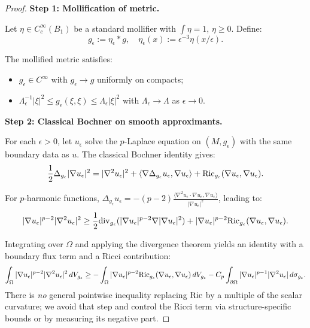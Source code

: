\begin{proof}
\textbf{Step 1: Mollification of metric.}

Let $\eta \in C^\infty_c(B_1)$ be a standard mollifier with $\int \eta = 1$, $\eta \ge 0$. Define:
\begin{equation}
    g_\epsilon := \eta_\epsilon * g, \quad \eta_\epsilon(x) := \epsilon^{-3} \eta(x/\epsilon).
\end{equation}

The mollified metric satisfies:
\begin{itemize}
    \item $g_\epsilon \in C^\infty$ with $g_\epsilon \to g$ uniformly on compacts;
    \item $\Lambda^{-1}_\epsilon |\xi|^2 \le g_\epsilon(\xi,\xi) \le \Lambda_\epsilon |\xi|^2$ with $\Lambda_\epsilon \to \Lambda$ as $\epsilon \to 0$.
\end{itemize}

\textbf{Step 2: Classical Bochner on smooth approximants.}

For each $\epsilon > 0$, let $u_\epsilon$ solve the $p$-Laplace equation on $(M, g_\epsilon)$ with the same boundary data as $u$. The classical Bochner identity gives:
\begin{equation}\label{eq:ClassicalBochner-app}
    \frac{1}{2} \Delta_{g_\epsilon} |\nabla u_\epsilon|^2 = |\nabla^2 u_\epsilon|^2 + \langle \nabla \Delta_{g_\epsilon} u_\epsilon, \nabla u_\epsilon \rangle + \mathrm{Ric}_{g_\epsilon}(\nabla u_\epsilon, \nabla u_\epsilon).
\end{equation}

For $p$-harmonic functions, $\Delta_{g_\epsilon} u_\epsilon = -(p-2) \frac{\langle \nabla^2 u_\epsilon \cdot \nabla u_\epsilon, \nabla u_\epsilon \rangle}{|\nabla u_\epsilon|^2}$, leading to:
\begin{equation}
    |\nabla u_\epsilon|^{p-2} |\nabla^2 u_\epsilon|^2 \ge \frac{1}{2} \mathrm{div}_{g_\epsilon}(|\nabla u_\epsilon|^{p-2} \nabla |\nabla u_\epsilon|^2) + |\nabla u_\epsilon|^{p-2} \mathrm{Ric}_{g_\epsilon}(\nabla u_\epsilon, \nabla u_\epsilon).
\end{equation}

Integrating over $\Omega$ and applying the divergence theorem yields an identity with a boundary flux term and a Ricci contribution:
\begin{equation}\label{eq:BochnerIntegrated}
    \int_\Omega |\nabla u_\epsilon|^{p-2} |\nabla^2 u_\epsilon|^2 \, dV_{g_\epsilon} \ge - \int_\Omega |\nabla u_\epsilon|^{p-2} \mathrm{Ric}_{g_\epsilon}(\nabla u_\epsilon, \nabla u_\epsilon) \, dV_{g_\epsilon} - C_p \int_{\partial\Omega} |\nabla u_\epsilon|^{p-1} |\nabla^2 u_\epsilon| \, d\sigma_{g_\epsilon}.
\end{equation}
There is \emph{no} general pointwise inequality replacing $\mathrm{Ric}$ by a multiple of the scalar curvature; we avoid that step and control the Ricci term via structure-specific bounds or by measuring its negative part.


\end{proof}

